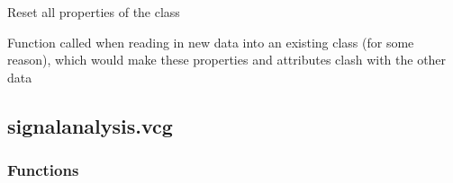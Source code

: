 \documentclass[letterpaper,10pt,english]{sphinxmanual}
\begin{document}
\begin{fulllineitems}
\begin{fulllineitems}
\begin{quote}
\begin{description}
\begin{itemize}
\end{itemize}

\end{description}\end{quote}

\end{fulllineitems}


\begin{fulllineitems}
\label{\detokenize{_autosummary/signalanalysis.general.Signal:signalanalysis.general.Signal.reset}}
\sphinxAtStartPar
Reset all properties of the class

\sphinxAtStartPar
Function called when reading in new data into an existing class (for some reason), which would make these
properties and attributes clash with the other data

\end{fulllineitems}


\end{fulllineitems}



\subsection{signalanalysis.vcg}
\label{\detokenize{_autosummary/signalanalysis.vcg:module-signalanalysis.vcg}}\label{\detokenize{_autosummary/signalanalysis.vcg:signalanalysis-vcg}}\label{\detokenize{_autosummary/signalanalysis.vcg::doc}}\subsubsection*{Functions}
\end{document}
